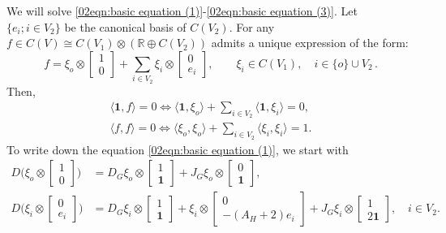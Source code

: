 \documentclass[pdflatex,sn-mathphys-num]{sn-jnl}
\theoremstyle{thmstyleone}%
\theoremstyle{thmstyletwo}%
\theoremstyle{thmstylethree}%
\begin{document}
%
We will solve \eqref{02eqn:basic equation (1)}-\eqref{02eqn:basic equation (3)}. Let $\{e_i; i\in V_2\}$ be the canonical basis of $C(V_2)$. For any $f\in C(V) \cong C(V_1)\otimes (\mathbb{R}\oplus C(V_2))$
admits a unique expression of the form:
%
\begin{equation}\label{02eqn:expansion of f in C(V)}
f=\xi_o\otimes \begin{bmatrix} 1 \\ 0 \end{bmatrix}
+ \sum_{i\in V_2} \xi_i\otimes \begin{bmatrix} 0 \\ e_i \end{bmatrix},
\qquad
\xi_i \in C(V_1),
\quad i\in \{o\}\cup V_2\,.
\end{equation}
%
Then, 
\begin{align}
\langle \mathbf{1},f\rangle=0 \iff \langle \mathbf{1}, \xi_o\rangle
+\sum_{i\in V_2} \langle \mathbf{1}, \xi_i\rangle=0
\label{02eqn:basic equation (13)},\\
\langle f,f\rangle=0 \iff \langle \xi_o, \xi_o\rangle
+\sum_{i\in V_2} \langle \xi_i, \xi_i\rangle=1.
\label{02eqn:basic equation (14)}
\end{align}
To write down the equation \eqref{02eqn:basic equation (1)}, we start with
\begin{align*}
D\bigg(\xi_o\otimes \begin{bmatrix} 1 \\ 0 \end{bmatrix}\bigg)
&=D_G\xi_o\otimes \begin{bmatrix} 1 \\ \mathbf{1} \end{bmatrix}
 +J_G\xi_o\otimes \begin{bmatrix} 0 \\ \mathbf{1} \end{bmatrix},
\\
D\bigg(\xi_i\otimes \begin{bmatrix} 0 \\ e_i \end{bmatrix}\bigg)
&=D_G\xi_i\otimes \begin{bmatrix} 1 \\ \mathbf{1} \end{bmatrix}
 +\xi_i\otimes \begin{bmatrix} 0 \\ -(A_H+2)e_i \end{bmatrix}
 +J_G\xi_i\otimes \begin{bmatrix} 1 \\ 2\mathbf{1} \end{bmatrix},
\quad i\in V_2.
\end{align*}
\end{document}
